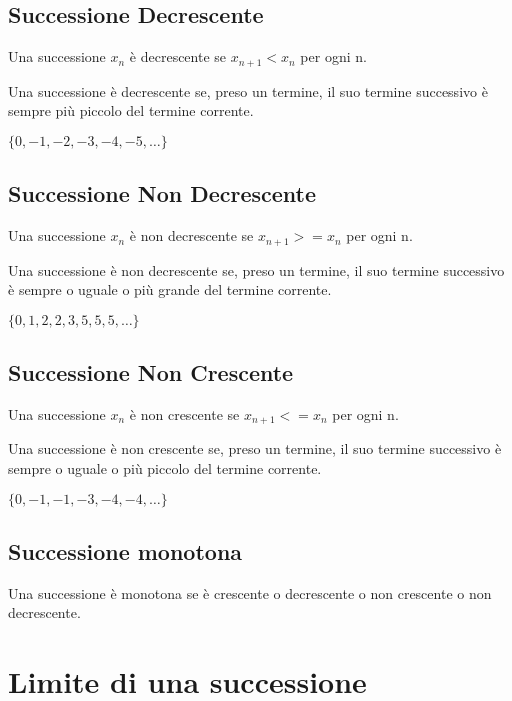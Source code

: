 \subsection{Successione Decrescente}

Una successione $x_{n}$ è decrescente se $x_{n+1} < x_{n}$ per ogni n.

\begin{tip}
Una successione è decrescente se, preso un termine, il suo termine successivo è sempre più piccolo del termine corrente. 

$\{ 0, -1, -2, -3, -4, -5, \ldots \}$
\end{tip}

\subsection{Successione Non Decrescente}

Una successione $x_{n}$ è non decrescente se $x_{n+1} >= x_{n}$ per ogni n.

\begin{tip}
Una successione è non decrescente se, preso un termine, il suo termine successivo è sempre o uguale o più grande del termine corrente.

$\{ 0, 1, 2, 2, 3, 5, 5, 5, \ldots \}$
\end{tip}

\subsection{Successione Non Crescente}

Una successione $x_{n}$ è non crescente se $x_{n+1} <= x_{n}$ per ogni n.

\begin{tip}
Una successione è non crescente se, preso un termine, il suo termine successivo è sempre o uguale o più piccolo del termine corrente.

$\{ 0, -1, -1, -3, -4, -4, \ldots \}$
\end{tip}

\subsection{Successione monotona}

Una successione è monotona se è crescente o decrescente o non crescente o non decrescente.

\section{Limite di una successione}

